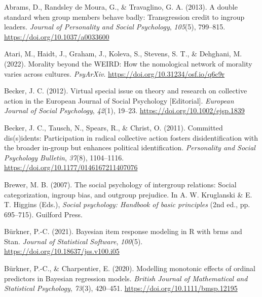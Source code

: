 \documentclass[twocolumn, 11pt, letterpaper]{article}
\newenvironment{CSLReferences}[2]{}{}
\begin{document}
\hypertarget{refs}{}
\begin{CSLReferences}{1}{0}
\leavevmode{}%
Abrams, D., Randsley de Moura, G., \& Travaglino, G. A. (2013). A double
standard when group members behave badly: {Transgression} credit to
ingroup leaders. \emph{Journal of Personality and Social Psychology},
\emph{105}(5), 799--815. \url{https://doi.org/10.1037/a0033600}

\leavevmode{}%
Atari, M., Haidt, J., Graham, J., Koleva, S., Stevens, S. T., \&
Dehghani, M. (2022). Morality beyond the {WEIRD}: How the nomological
network of morality varies across cultures. \emph{PsyArXiv}.
\url{https://doi.org/10.31234/osf.io/q6c9r}

\leavevmode{}%
Becker, J. C. (2012). Virtual special issue on theory and research on
collective action in the {European} {Journal} of {Social} {Psychology}
{[}{Editorial}{]}. \emph{European Journal of Social Psychology},
\emph{42}(1), 19--23. \url{https://doi.org/10.1002/ejsp.1839}

\leavevmode{}%
Becker, J. C., Tausch, N., Spears, R., \& Christ, O. (2011). Committed
dis(s)idents: {Participation} in radical collective action fosters
disidentification with the broader in-group but enhances political
identification. \emph{Personality and Social Psychology Bulletin},
\emph{37}(8), 1104--1116. \url{https://doi.org/10.1177/0146167211407076}

\leavevmode{}%
Brewer, M. B. (2007). The social psychology of intergroup relations:
Social categorization, ingroup bias, and outgroup prejudice. In A. W.
Kruglanski \& E. T. Higgins (Eds.), \emph{Social psychology: Handbook of
basic principles} (2nd ed., pp. 695--715). Guilford Press.

\leavevmode{}%
Bürkner, P.-C. (2021). Bayesian item response modeling in {R} with brms
and {Stan}. \emph{Journal of Statistical Software}, \emph{100}(5).
\url{https://doi.org/10.18637/jss.v100.i05}

\leavevmode{}%
Bürkner, P.-C., \& Charpentier, E. (2020). Modelling monotonic effects
of ordinal predictors in {Bayesian} regression models. \emph{British
Journal of Mathematical and Statistical Psychology}, \emph{73}(3),
420--451. \url{https://doi.org/10.1111/bmsp.12195}


\end{CSLReferences}
\end{document}
